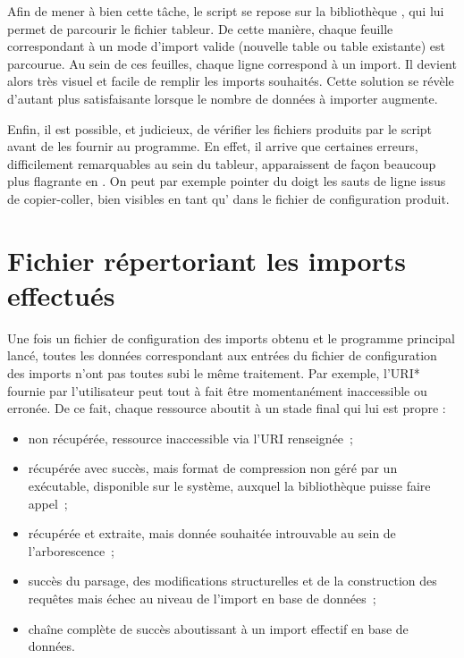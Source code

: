 Afin de mener à bien cette tâche, le script se repose sur la bibliothèque , qui lui permet de parcourir le fichier tableur. De cette manière, chaque feuille correspondant à un mode d'import valide (nouvelle table ou table existante) est parcourue. Au sein de ces feuilles, chaque ligne correspond à un import. Il devient alors très visuel et facile de remplir les imports souhaités. Cette solution se révèle d'autant plus satisfaisante lorsque le nombre de données à importer augmente.

Enfin, il est possible, et judicieux, de vérifier les fichiers  produits par le script avant de les fournir au programme. En effet, il arrive que certaines erreurs, difficilement remarquables au sein du tableur, apparaissent de façon beaucoup plus flagrante en . On peut par exemple pointer du doigt les sauts de ligne issus de copier-coller, bien visibles en tant qu' dans le fichier de configuration  produit.

\section{Fichier répertoriant les imports effectués}

Une fois un fichier de configuration des imports obtenu et le programme principal lancé, toutes les données correspondant aux entrées du fichier de configuration des imports n'ont pas toutes subi le même traitement. Par exemple, l'\gls{URI}* fournie par l'utilisateur peut tout à fait être momentanément inaccessible ou erronée. De ce fait, chaque ressource aboutit à un stade final qui lui est propre :

\begin{itemize}
  \item non récupérée, ressource inaccessible via l'URI renseignée~;
  \item récupérée avec succès, mais format de compression non géré par un exécutable, disponible sur le système, auxquel la bibliothèque  puisse faire appel~;
  \item récupérée et extraite, mais donnée souhaitée introuvable au sein de l'arborescence~;
  \item succès du parsage, des modifications structurelles et de la construction des requêtes mais échec au niveau de l'import en base de données~;
  \item chaîne complète de succès aboutissant à un import effectif en base de données.
\end{itemize}

